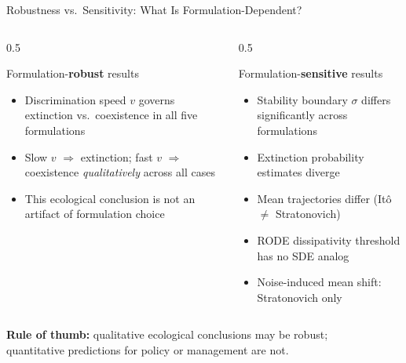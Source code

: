 \documentclass{beamer}
\begin{document}
\begin{frame}{Robustness vs.\ Sensitivity: What Is Formulation-Dependent?}

  \begin{columns}[T]
    \begin{column}{0.5\textwidth}
      \begin{block}{Formulation-\textbf{robust} results}
        \begin{itemize}
          \item Discrimination speed $v$ governs extinction vs.\ coexistence in all five formulations
          \item Slow $v$ $\Rightarrow$ extinction; fast $v$ $\Rightarrow$ coexistence \emph{qualitatively} across all cases
          \item This ecological conclusion is not an artifact of formulation choice
        \end{itemize}
      \end{block}
    \end{column}

    \begin{column}{0.5\textwidth}
      \begin{alertblock}{Formulation-\textbf{sensitive} results}
        \begin{itemize}
          \item Stability boundary $\sigma$ differs significantly across formulations
          \item Extinction probability estimates diverge
          \item Mean trajectories differ (It\^{o} $\neq$ Stratonovich)
          \item RODE dissipativity threshold has no SDE analog
          \item Noise-induced mean shift: Stratonovich only
        \end{itemize}
      \end{alertblock}
    \end{column}
  \end{columns}

  \vspace{0.4cm}
  \begin{center}
    \textbf{Rule of thumb:} qualitative ecological conclusions may be robust;\\
    quantitative predictions for policy or management are not.
  \end{center}

\end{frame}
\end{document}
